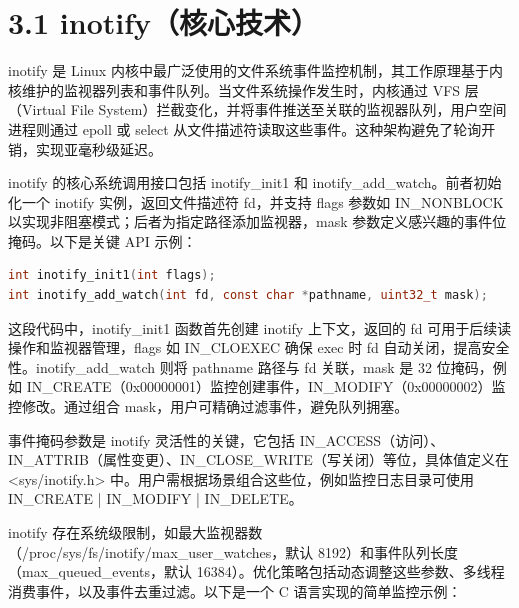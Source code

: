 \section{3.1 inotify（核心技术）}
inotify 是 Linux 内核中最广泛使用的文件系统事件监控机制，其工作原理基于内核维护的监视器列表和事件队列。当文件系统操作发生时，内核通过 VFS 层（Virtual File System）拦截变化，并将事件推送至关联的监视器队列，用户空间进程则通过 epoll 或 select 从文件描述符读取这些事件。这种架构避免了轮询开销，实现亚毫秒级延迟。\par
inotify 的核心系统调用接口包括 inotify\_{}init1 和 inotify\_{}add\_{}watch。前者初始化一个 inotify 实例，返回文件描述符 fd，并支持 flags 参数如 IN\_{}NONBLOCK 以实现非阻塞模式；后者为指定路径添加监视器，mask 参数定义感兴趣的事件位掩码。以下是关键 API 示例：\par
\begin{lstlisting}[language=c]
int inotify_init1(int flags);
int inotify_add_watch(int fd, const char *pathname, uint32_t mask);
\end{lstlisting}
这段代码中，inotify\_{}init1 函数首先创建 inotify 上下文，返回的 fd 可用于后续读操作和监视器管理，flags 如 IN\_{}CLOEXEC 确保 exec 时 fd 自动关闭，提高安全性。inotify\_{}add\_{}watch 则将 pathname 路径与 fd 关联，mask 是 32 位掩码，例如 IN\_{}CREATE（0x00000001）监控创建事件，IN\_{}MODIFY（0x00000002）监控修改。通过组合 mask，用户可精确过滤事件，避免队列拥塞。\par
事件掩码参数是 inotify 灵活性的关键，它包括 IN\_{}ACCESS（访问）、IN\_{}ATTRIB（属性变更）、IN\_{}CLOSE\_{}WRITE（写关闭）等位，具体值定义在 <sys/inotify.h> 中。用户需根据场景组合这些位，例如监控日志目录可使用 IN\_{}CREATE | IN\_{}MODIFY | IN\_{}DELETE。\par
inotify 存在系统级限制，如最大监视器数（/proc/sys/fs/inotify/max\_{}user\_{}watches，默认 8192）和事件队列长度（max\_{}queued\_{}events，默认 16384）。优化策略包括动态调整这些参数、多线程消费事件，以及事件去重过滤。以下是一个 C 语言实现的简单监控示例：\par
